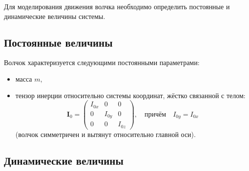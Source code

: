 \documentclass{article}
\begin{document}
Для моделирования движения волчка необходимо определить постоянные и динамические величины системы.

\subsection{Постоянные величины}

Волчок характеризуется следующими постоянными параметрами:
\begin{itemize}
\item масса $m$,
\item тензор инерции относительно системы координат, жёстко связанной с телом:
\[
\mathbf{I}_0 = \begin{pmatrix}
I_{0x} & 0 & 0 \\
0 & I_{0y} & 0 \\
0 & 0 & I_{0z}
\end{pmatrix}, 
\quad \text{причём} \quad I_{0y} = I_{0x}
\]
(волчок симметричен и вытянут относительно главной оси).
\end{itemize}




\subsection{Динамические величины}
\end{document}
